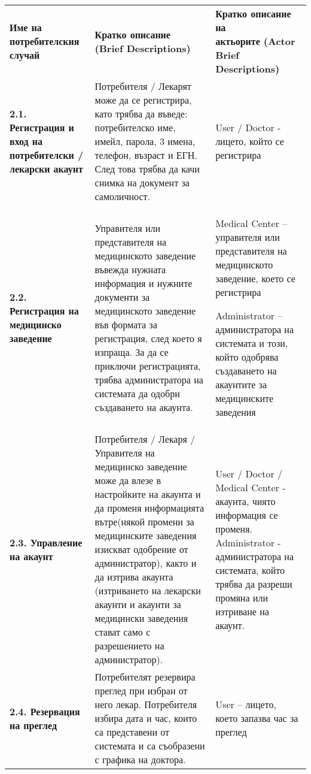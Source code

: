 \documentclass[a4paper,12pt]{article}
\begin{document}
\begin{xltabular}{\textwidth}{|p{4cm}|p{6cm}|p{6cm}|}
\hline
\hline
{} \\
\hline
{} \parbox[t]{12cm}{\textbf{
  Име на \\
  потребителския \\
  случай
}} & \parbox[t]{12cm}{\textbf{
  Кратко описание \\
  (Brief Descriptions)
}} & \parbox[t]{12cm}{\textbf{
  Кратко описание на \\
  актьорите (Actor Brief \\
  Descriptions)
}} \\
\hline
{}\textbf{2.1. Регистрация и вход на потребителски / лекарски акаунт} & 
Потребителя / Лекарят може да се регистрира, като трябва да въведе: потребителско име, имейл, парола, 3 имена, телефон, възраст и ЕГН. След това трябва да качи снимка на документ за самоличност. &
User / Doctor - лицето, който се регистрира \\
\hline
{}\textbf{2.2. Регистрация на медицинско заведение} &
Управителя или представителя на медицинското заведение въвежда нужната информация и нужните документи за медицинското заведение във формата за регистрация, след което я изпраща. За да се приключи регистрацията, трябва администратора на системата да одобри създаването на акаунта. &
Medical Center – управителя или представителя на медицинското заведение, което се регистрира

Administrator – администратора на системата и този, който одобрява създаването на акаунтите за медицинските заведения \\
\hline
{}\textbf{2.3. Управление на акаунт} &
Потребителя / Лекаря / Управителя на медицинско заведение може да влезе в настройките на акаунта и да променя информацията вътре(някой промени за медицинските заведения изискват одобрение от администратор), както и да изтрива акаунта (изтриването на лекарски акаунти и акаунти за медицински заведения стават само с разрешението на администратор). &
User / Doctor / Medical Center - акаунта, чиято информация се променя.
Administrator - администратора на системата, който трябва да разреши промяна или изтриване на акаунт. \\
\hline
{}\textbf{2.4. Резервация на преглед} &
Потребителят резервира преглед при избран от него лекар. Потребителя избира дата и час, които са представени от системата и са съобразени с графика на доктора. &
User – лицето, което запазва час за преглед


\end{xltabular}
\end{document}
